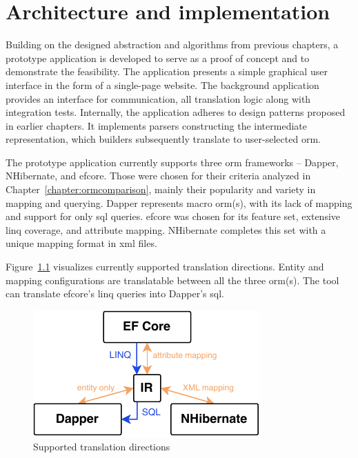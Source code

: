\chapter{Architecture and implementation}\label{chapter:architecture}

Building on the designed abstraction and algorithms from previous chapters, a prototype application is developed to serve as a proof of concept and to demonstrate the feasibility. The application presents a simple graphical user interface in the form of a single-page website. The background application provides an interface for communication, all translation logic along with integration tests. Internally, the application adheres to design patterns proposed in earlier chapters. It implements parsers constructing the intermediate representation, which builders subsequently translate to user-selected \acrshort{orm}.

The prototype application currently supports three \acrshort{orm} frameworks -- Dapper, NHibernate, and \acrshort{efcore}. Those were chosen for their criteria analyzed in Chapter~\ref{chapter:ormcomparison}, mainly their popularity and variety in mapping and querying. Dapper represents macro \acrshort{orm}(s), with its lack of mapping and support for only \acrshort{sql} queries. \acrshort{efcore} was chosen for its feature set, extensive \acrshort{linq} coverage, and attribute mapping. NHibernate completes this set with a unique mapping format in \acrshort{xml} files.

Figure~\ref{fig:supported_directions} visualizes currently supported translation directions. Entity and mapping configurations are translatable between all the three \acrshort{orm}(s). The tool can translate \acrshort{efcore}'s \acrshort{linq} queries into Dapper's \acrshort{sql}.

\begin{figure}[!htp]
  \centering
  \includegraphics[scale=1.5]{thesis/img/thesis/06_supported_directions.drawio.pdf}
  \caption{Supported translation directions}
  \label{fig:supported_directions}
\end{figure}

